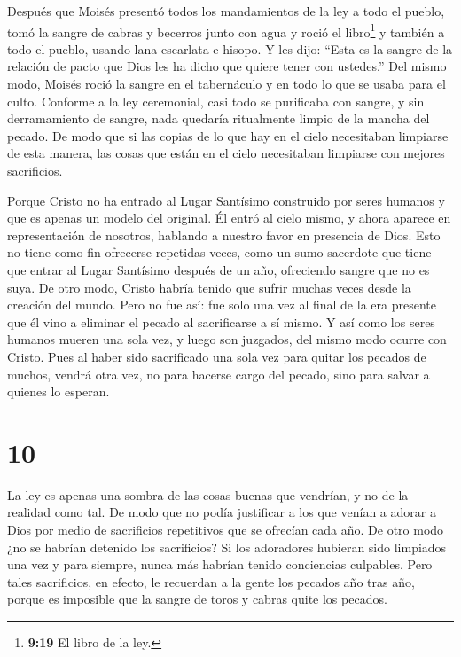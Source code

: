  Después que Moisés presentó todos los mandamientos de la
ley a todo el pueblo, tomó la sangre de cabras y becerros junto con agua
y roció el libro\footnote{\textbf{9:19} El libro de la ley.} y también a
todo el pueblo, usando lana escarlata e hisopo.  Y les
dijo: ``Esta es la sangre de la relación de pacto que Dios les ha dicho
que quiere tener con ustedes.''  Del mismo modo, Moisés
roció la sangre en el tabernáculo y en todo lo que se usaba para el
culto.  Conforme a la ley ceremonial, casi todo se
purificaba con sangre, y sin derramamiento de sangre, nada quedaría
ritualmente limpio de la mancha del pecado.  De modo que si
las copias de lo que hay en el cielo necesitaban limpiarse de esta
manera, las cosas que están en el cielo necesitaban limpiarse con
mejores sacrificios.

 Porque Cristo no ha entrado al Lugar Santísimo construido
por seres humanos y que es apenas un modelo del original. Él entró al
cielo mismo, y ahora aparece en representación de nosotros, hablando a
nuestro favor en presencia de Dios.  Esto no tiene como fin
ofrecerse repetidas veces, como un sumo sacerdote que tiene que entrar
al Lugar Santísimo después de un año, ofreciendo sangre que no es suya.
 De otro modo, Cristo habría tenido que sufrir muchas veces
desde la creación del mundo. Pero no fue así: fue solo una vez al final
de la era presente que él vino a eliminar el pecado al sacrificarse a sí
mismo.  Y así como los seres humanos mueren una sola vez, y
luego son juzgados,  del mismo modo ocurre con Cristo. Pues
al haber sido sacrificado una sola vez para quitar los pecados de
muchos, vendrá otra vez, no para hacerse cargo del pecado, sino para
salvar a quienes lo esperan.

\hypertarget{section-9}{%
\section{10}\label{section-9}}

 La ley es apenas una sombra de las cosas buenas que
vendrían, y no de la realidad como tal. De modo que no podía justificar
a los que venían a adorar a Dios por medio de sacrificios repetitivos
que se ofrecían cada año.  De otro modo ¿no se habrían
detenido los sacrificios? Si los adoradores hubieran sido limpiados una
vez y para siempre, nunca más habrían tenido conciencias culpables.
 Pero tales sacrificios, en efecto, le recuerdan a la gente
los pecados año tras año,  porque es imposible que la sangre
de toros y cabras quite los pecados.

